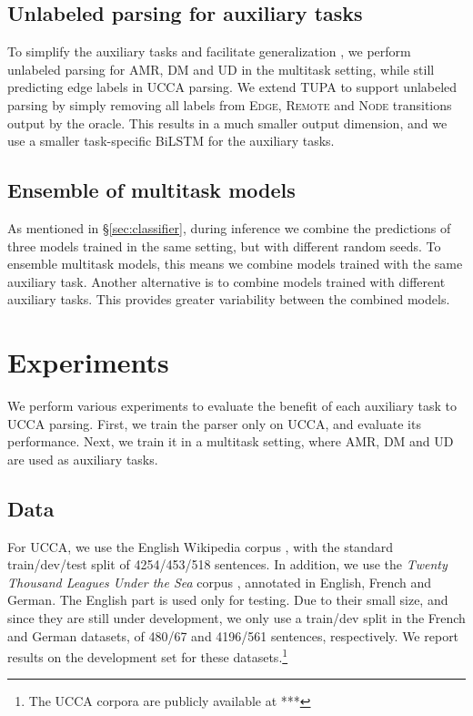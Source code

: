 \documentclass[11pt,a4paper]{article}
\begin{document}
\subsection{Unlabeled parsing for auxiliary tasks}\label{sec:unlabeled_aux}

To simplify the auxiliary tasks and facilitate generalization \cite{E17-2026},
we perform unlabeled parsing for AMR, DM and UD in the multitask setting,
while still predicting edge labels in UCCA parsing.
We extend TUPA to support unlabeled parsing by simply removing all labels from
\textsc{Edge}, \textsc{Remote} and \textsc{Node} transitions output by the oracle.
This results in a much smaller output dimension,
and we use a smaller task-specific BiLSTM for the auxiliary tasks.

\subsection{Ensemble of multitask models}\label{sec:ensemble_multitask}

As mentioned in \S\ref{sec:classifier}, during inference we combine the predictions
of three models trained in the same setting, but with different random seeds.
To ensemble multitask models, this means we combine models trained with the same auxiliary task.
Another alternative is to combine models trained with different auxiliary tasks.
This provides greater variability between the combined models.


\section{Experiments}\label{sec:experiments}

We perform various experiments to evaluate the benefit of each auxiliary task to UCCA parsing.
First, we train the parser only on UCCA, and evaluate its performance.
Next, we train it in a multitask setting, where AMR, DM and UD are used as
auxiliary tasks.

\subsection{Data}\label{sec:data}

For UCCA, we use the English Wikipedia corpus \cite{abend2013universal},
with the standard train/dev/test split of 4254/453/518 sentences.
In addition, we use
the \textit{Twenty Thousand Leagues Under the Sea} corpus \cite[20K leagues;][]{sulem2015conceptual},
annotated in English, French and German.
The English part is used only for testing.
Due to their small size, and since they are still under development, we only use a train/dev split
in the French and German datasets, of 480/67 and 4196/561 sentences, respectively.
We report results on the development set for these datasets.\footnote{The UCCA corpora are publicly
available at ***}
\end{document}
